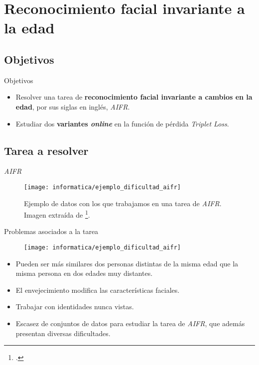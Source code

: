 \section{Reconocimiento facial invariante a la edad}

\subsection{Objetivos}
\begin{frame}{Objetivos}

	\begin{itemize}
		\item Resolver una tarea de \textbf{reconocimiento facial invariante a cambios en la edad}, por sus siglas en inglés, \textit{AIFR}.
	\end{itemize}

	\begin{itemize}
		\item Estudiar dos \textbf{variantes \textit{online}} en la función de pérdida \textit{Triplet Loss}.
	\end{itemize}

\end{frame}

\subsection{Tarea a resolver}

\begin{frame}{\textit{AIFR}}

	\begin{figure}
		\texttt{[image: informatica/ejemplo\_dificultad\_aifr]}
		\caption{Ejemplo de datos con los que trabajamos en una tarea de \textit{AIFR}. Imagen extraída de \footcite{informatica:aifr_survey}.}
		\label{img:ejemplo_dificultad_aifr}
	\end{figure}

\end{frame}

\begin{frame}{Problemas asociados a la tarea}

	\begin{figure}
		\texttt{[image: informatica/ejemplo\_dificultad\_aifr]}
	\end{figure}

	\begin{itemize}
		\item Pueden ser más similares dos personas distintas de la misma edad que la misma persona en dos edades muy distantes.
		\item El envejecimiento modifica las características faciales.
		\item Trabajar con identidades nunca vistas.
		\item Escasez de conjuntos de datos para estudiar la tarea de \textit{AIFR}, que además presentan diversas dificultades.
	\end{itemize}

\end{frame}

